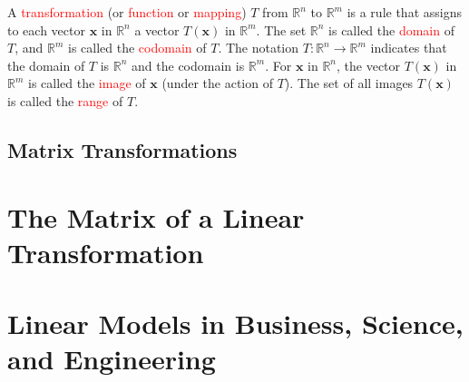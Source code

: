 \documentclass[12pt,a4paper]{article}
\renewcommand{\vec}[1]{\boldsymbol{#1}}
\begin{document}
A \textcolor{red}{transformation} (or \textcolor{red}{function} or \textcolor{red}{mapping}) $T$ from $\mathbb R^n$ to $\mathbb R^m$ is a rule that assigns to each vector $\vec{x}$ in $\mathbb R^n$ a vector $T(\vec{x})$ in $\mathbb R^m$. The set $\mathbb R^n$ is called the \textcolor{red}{domain} of $T$, and $\mathbb R^m$ is called the \textcolor{red}{codomain} of $T$. The notation $T : \mathbb R^n \rightarrow \mathbb R^m$ indicates that the domain of $T$ is $\mathbb R^n$ and the codomain is $\mathbb R^m$. For $\vec{x}$ in $\mathbb R^n$, the vector $T(\vec{x})$ in $\mathbb R^m$ is called the \textcolor{red}{image} of $\vec{x}$ (under the action of $T$). The set of all images $T(\vec{x})$ is called the \textcolor{red}{range} of $T$.


\subsection{Matrix Transformations}











\section{The Matrix of a Linear Transformation}
















\section{Linear Models in Business, Science, and Engineering}
\end{document}
